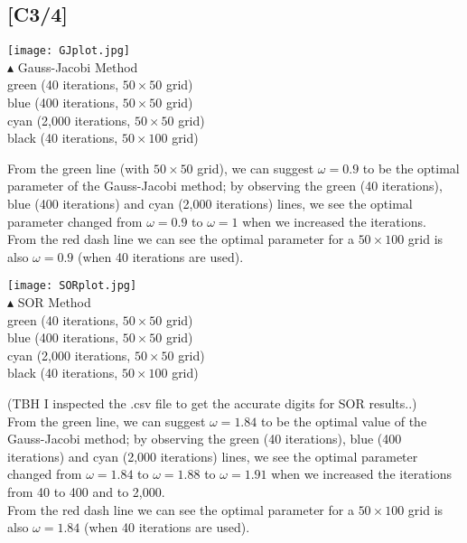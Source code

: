 \documentclass[12pt,a4paper]{article}
\newcommand{\x}{\times}
\begin{document}
\subsection*{[C3/4]}
\begin{center}
\texttt{[image: GJplot.jpg]}\\
$\blacktriangle$ Gauss-Jacobi Method\\
green (40 iterations, $50\x50$ grid) \\
blue (400 iterations, $50\x50$ grid) \\
cyan (2,000 iterations, $50\x50$ grid)\\
black (40 iterations, $50\x100$ grid)
\end{center}
From the green line (with $50\x50$ grid), we can suggest $\omega = 0.9$ to be the optimal parameter of the Gauss-Jacobi method; by observing the green (40 iterations), blue (400 iterations) and cyan (2,000 iterations) lines, we see the optimal parameter changed from $\omega = 0.9$ to $\omega = 1$ when we increased the iterations. \\
From the red dash line we can see the optimal parameter for a $50\x100$ grid is also $\omega  = 0.9$ (when 40 iterations are used).
\begin{center}
\texttt{[image: SORplot.jpg]} \\
$\blacktriangle$ SOR Method\\
green (40 iterations, $50\x50$ grid) \\
blue (400 iterations, $50\x50$ grid) \\
cyan (2,000 iterations, $50\x50$ grid)\\
black (40 iterations, $50\x100$ grid)\\
\end{center}
(TBH I inspected the .csv file to get the accurate digits for SOR results..) \\
From the green line, we can suggest $\omega = 1.84$ to be the optimal value of the Gauss-Jacobi method; by observing the green (40 iterations), blue (400 iterations) and cyan (2,000 iterations) lines, we see the optimal parameter changed from $\omega = 1.84$ to $\omega = 1.88$ to $\omega = 1.91$ when we increased the iterations from 40 to 400 and to 2,000. \\
From the red dash line we can see the optimal parameter for a $50\x100$ grid is also $\omega  = 1.84$ (when 40 iterations are used).
\end{document}
